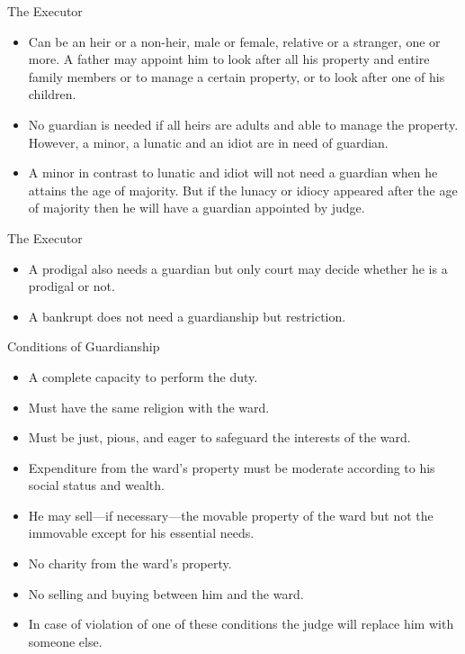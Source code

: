 \begin{frame}{The Executor \hfill {}}
\begin{itemize}
\item Can be an heir or a non-heir, male or female, relative or a stranger, one or more. A father may appoint him to look after all his property and entire family members or to manage a certain property, or to look after one of his children.
\item No guardian is needed if all heirs are adults and able to manage the property. However, a minor, a lunatic and an idiot are in need of guardian.
\item A minor in contrast to lunatic and idiot will not need a guardian when he attains the age of majority. But if the lunacy or idiocy appeared after the age of majority then he will have a guardian appointed by judge.
\end{itemize}
\end{frame}

\begin{frame}{The Executor \hfill {}}
\begin{itemize}
\item A prodigal also needs a guardian but only court may decide whether he is a prodigal or not.
\item A bankrupt does not need a guardianship but restriction.
\end{itemize}
\end{frame}

\begin{frame}{Conditions of Guardianship}
\begin{itemize}
\item A complete capacity to perform the duty.
\item Must have the same religion with the ward.
\item Must be just, pious, and eager to safeguard the interests of the ward.
\item Expenditure from the ward’s property must be moderate according to his social status and wealth.
\item He may sell---if necessary---the movable property of the ward but not the immovable except for his essential needs.
\item No charity from the ward’s property.
\item No selling and buying between him and the ward.
\item In case of violation of one of these conditions the judge will replace him with someone else.
\end{itemize}
\end{frame}

